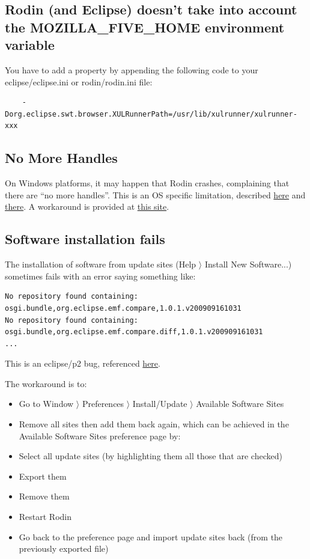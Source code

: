\subsection{Rodin (and Eclipse) doesn't take into account the MOZILLA\_FIVE\_HOME environment variable}

You have to add a property by appending the following code to your \textsf{eclipse/eclipse.ini} or \textsf{rodin/rodin.ini} file: 

\begin{verbatim} 
	-Dorg.eclipse.swt.browser.XULRunnerPath=/usr/lib/xulrunner/xulrunner-xxx 
\end{verbatim} 

\subsection{No More Handles}

On Windows platforms, it may happen that Rodin crashes, complaining that there are ``no more handles''. This is an OS specific limitation, described \href{http://journals.jevon.org/users/jevon-phd/entry/19833}{here} and \href{https://bugs.eclipse.org/bugs/show_bug.cgi?id=211124}{there}. A workaround is provided at \href{http://blogs.msdn.com/b/ntdebugging/archive/2007/01/04/desktop-heap-overview.aspx}{this site}. 

\subsection{Software installation fails}

The installation of software from update sites (\textsf{Help $\rangle$ Install New Software...}) sometimes fails with an error saying something like: 

\begin{verbatim}
No repository found containing: osgi.bundle,org.eclipse.emf.compare,1.0.1.v200909161031
No repository found containing: osgi.bundle,org.eclipse.emf.compare.diff,1.0.1.v200909161031
...
\end{verbatim}

This is an eclipse/p2 bug, referenced \href{http://stackoverflow.com/questions/511367/error-when-updating-eclipse}{here}. 

The workaround is to: 

\begin{itemize}
	\item Go to \textsf{Window $\rangle$ Preferences $\rangle$ Install/Update $\rangle$ Available Software Sites} 
	\item Remove all sites then add them back again, which can be achieved in the \textsf{Available Software Sites} preference page by: 
	\item Select all update sites (by highlighting them all those that are checked) 
	\item Export them 
	\item Remove them
	\item Restart Rodin
	\item Go back to the preference page and import update sites back (from the previously exported file) 
\end{itemize}

